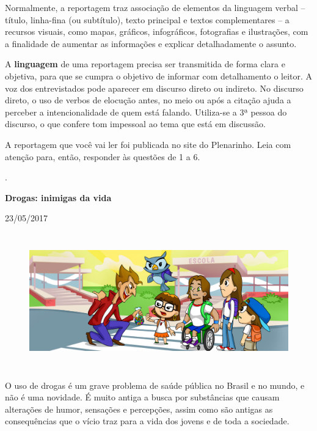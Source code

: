 \begin{itemize}
\begin{itemize}
{\begin{itemize}
\begin{itemize}
{Normalmente, a reportagem traz associação de elementos da linguagem
verbal -- título, linha-fina (ou subtítulo), texto principal e textos
complementares -- a recursos visuais, como mapas, gráficos,
infográficos, fotografias e ilustrações, com a finalidade de aumentar as
informações e explicar detalhadamente o assunto.

A \textbf{linguagem} de uma reportagem precisa ser transmitida de forma
clara e objetiva, para que se cumpra o objetivo de informar com
detalhamento o leitor. A voz dos entrevistados pode aparecer em discurso
direto ou indireto. No discurso direto, o uso de verbos de elocução
antes, no meio ou após a citação ajuda a perceber a intencionalidade de
quem está falando. Utiliza-se a 3ª pessoa do discurso, o que confere tom
impessoal ao tema que está em discussão.
}


A reportagem que você vai ler foi publicada no site do Plenarinho. Leia
com atenção para, então, responder às questões de 1 a 6.

.

\textbf{Drogas: inimigas da vida}

23/05/2017

\begin{figure}
\centering
\includegraphics[width=5.90556in,height=2.30417in]{./_SAEB_9_POR/media/image17.jpeg}
\caption{}
\end{figure}

O uso de drogas é um grave problema de saúde pública no Brasil e no
mundo, e não é uma novidade. É muito antiga a busca por substâncias que
causam alterações de humor, sensações e percepções, assim como são
antigas as consequências que o vício traz para a vida dos jovens e de
toda a sociedade.


\end{itemize}
\end{itemize}}
\end{itemize}
\end{itemize}
